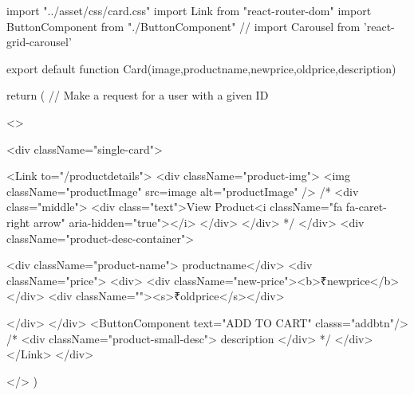 import "../asset/css/card.css"
import { Link } from "react-router-dom"
import ButtonComponent from "./ButtonComponent"
// import Carousel from 'react-grid-carousel'

export default function Card({image,productname,newprice,oldprice,description}) {

  return (
    // Make a request for a user with a given ID

    <>

      <div className="single-card">

<Link to="/productdetails">
        <div className="product-img">
          <img className="productImage" src={image} alt="productImage" />
          {/* <div class="middle">
            <div class="text">View Product<i className="fa fa-caret-right arrow" aria-hidden="true"></i>
            </div>
          </div> */}
        </div>
        <div className="product-desc-container">
        
            <div className="product-name"> {productname}</div>
            <div className="price">
              <div>
              <div className="new-price"><b>₹{newprice}</b></div>
              <div className=""><s>₹{oldprice}</s></div>
            
              </div>
                         </div>
                         <ButtonComponent text="ADD TO CART" classs="addbtn"/>
            {/* <div className="product-small-desc">
             {description}
            </div> */}
        </div>
        </Link>
      </div>
  


    </>
  )
  
}

